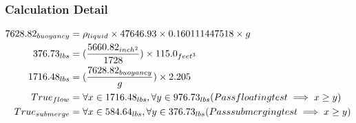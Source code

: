 \documentclass{article}%
\begin{document}
%
\subsubsection{Calculation Detail}%
\label{ssubsec:CalculationDetail}%
\begin{align}%
7628.82_{buoyancy} &=\rho_{liquid}\times 47646.93\times 0.160111447518 \times g\notag\\%
376.73_{lbs} &=(\frac{5660.82_{inch^2}}{1728})\times 115.0_{feet^3}\notag\\%
1716.48_{lbs} &=(\frac{7628.82_{buoyancy}}{g})\times 2.205\notag\\%
True_{flow} &= \forall x\in 1716.48_{lbs}, \forall y\in 976.73_{lbs} (Pass floating test \implies x \geq y)\notag\\%
True_{submerge} &= \forall x\in 584.64_{lbs}, \forall y\in 376.73_{lbs} (Pass submerging test \implies x \geq y)\notag%
\end{align}

%
\end{document}
